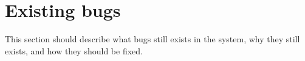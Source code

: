\section{Existing bugs}
This section should describe what bugs still exists in the system, why they still exists, and how they should be fixed.